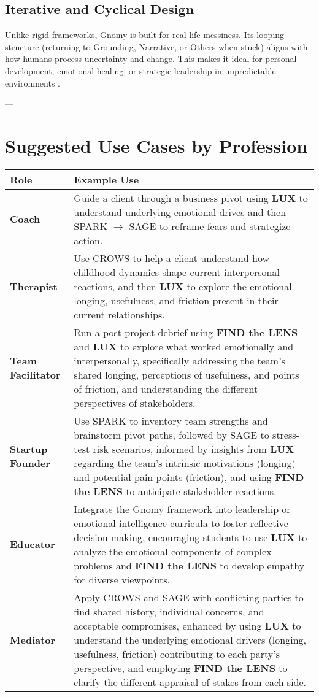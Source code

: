 \documentclass{article}
\begin{document}
\subsection{Iterative and Cyclical Design}
Unlike rigid frameworks, Gnomy is built for real-life messiness. Its looping structure (returning to Grounding, Narrative, or Others when stuck) aligns with how humans process uncertainty and change. This makes it ideal for personal development, emotional healing, or strategic leadership in unpredictable environments \cite{kolb1984experiential}.

---

\section{Suggested Use Cases by Profession}
\begin{tabular}{|p{}|p{}|}
    \hline
    \textbf{Role} & \textbf{Example Use} \\
    \hline
    \textbf{Coach} & Guide a client through a business pivot using \textbf{LUX} to understand underlying emotional drives and then SPARK $\rightarrow$ SAGE to reframe fears and strategize action. \\
    \textbf{Therapist} & Use CROWS to help a client understand how childhood dynamics shape current interpersonal reactions, and then \textbf{LUX} to explore the emotional longing, usefulness, and friction present in their current relationships. \\
    \textbf{Team Facilitator} & Run a post-project debrief using \textbf{FIND the LENS} and \textbf{LUX} to explore what worked emotionally and interpersonally, specifically addressing the team's shared longing, perceptions of usefulness, and points of friction, and understanding the different perspectives of stakeholders. \\
    \textbf{Startup Founder} & Use SPARK to inventory team strengths and brainstorm pivot paths, followed by SAGE to stress-test risk scenarios, informed by insights from \textbf{LUX} regarding the team's intrinsic motivations (longing) and potential pain points (friction), and using \textbf{FIND the LENS} to anticipate stakeholder reactions. \\
    \textbf{Educator} & Integrate the Gnomy framework into leadership or emotional intelligence curricula to foster reflective decision-making, encouraging students to use \textbf{LUX} to analyze the emotional components of complex problems and \textbf{FIND the LENS} to develop empathy for diverse viewpoints. \\
    \textbf{Mediator} & Apply CROWS and SAGE with conflicting parties to find shared history, individual concerns, and acceptable compromises, enhanced by using \textbf{LUX} to understand the underlying emotional drivers (longing, usefulness, friction) contributing to each party's perspective, and employing \textbf{FIND the LENS} to clarify the different appraisal of stakes from each side. \\
    \hline
\end{tabular}
\end{document}
